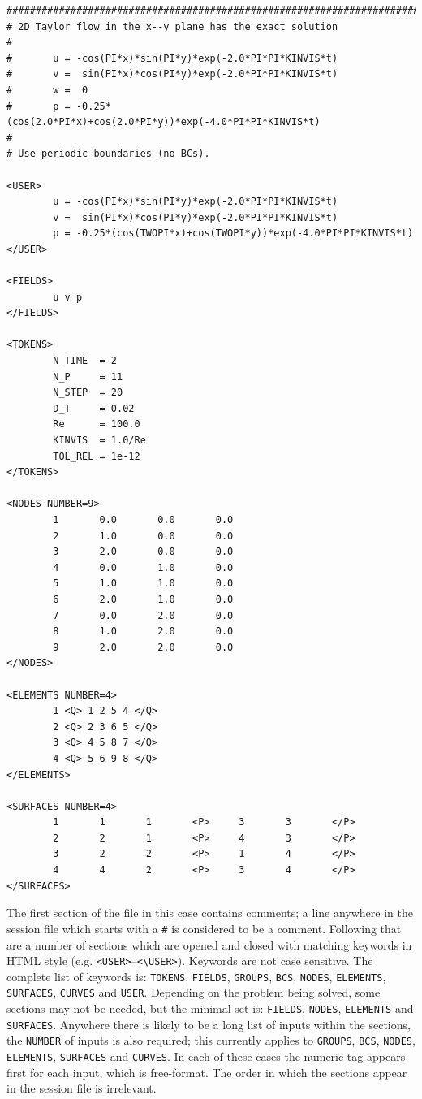 \documentclass[11pt,a4paper]{report}
\begin{document}
{\small
\begin{verbatim}
##############################################################################
# 2D Taylor flow in the x--y plane has the exact solution
#
#       u = -cos(PI*x)*sin(PI*y)*exp(-2.0*PI*PI*KINVIS*t)
#       v =  sin(PI*x)*cos(PI*y)*exp(-2.0*PI*PI*KINVIS*t)
#       w =  0
#       p = -0.25*(cos(2.0*PI*x)+cos(2.0*PI*y))*exp(-4.0*PI*PI*KINVIS*t)
#
# Use periodic boundaries (no BCs).

<USER>
        u = -cos(PI*x)*sin(PI*y)*exp(-2.0*PI*PI*KINVIS*t)
        v =  sin(PI*x)*cos(PI*y)*exp(-2.0*PI*PI*KINVIS*t)
        p = -0.25*(cos(TWOPI*x)+cos(TWOPI*y))*exp(-4.0*PI*PI*KINVIS*t)
</USER>

<FIELDS>
        u v p
</FIELDS>

<TOKENS>
        N_TIME  = 2
        N_P     = 11
        N_STEP  = 20
        D_T     = 0.02
        Re      = 100.0
        KINVIS  = 1.0/Re
        TOL_REL = 1e-12
</TOKENS>

<NODES NUMBER=9>
        1       0.0       0.0       0.0
        2       1.0       0.0       0.0
        3       2.0       0.0       0.0
        4       0.0       1.0       0.0
        5       1.0       1.0       0.0
        6       2.0       1.0       0.0
        7       0.0       2.0       0.0
        8       1.0       2.0       0.0
        9       2.0       2.0       0.0
</NODES>

<ELEMENTS NUMBER=4>
        1 <Q> 1 2 5 4 </Q>
        2 <Q> 2 3 6 5 </Q>
        3 <Q> 4 5 8 7 </Q>
        4 <Q> 5 6 9 8 </Q>
</ELEMENTS>

<SURFACES NUMBER=4>
        1       1       1       <P>     3       3       </P>
        2       2       1       <P>     4       3       </P>
        3       2       2       <P>     1       4       </P>
        4       4       2       <P>     3       4       </P>
</SURFACES>
\end{verbatim}
}

The first section of the file in this case contains comments; a line
anywhere in the session file which starts with a \verb+#+ is
considered to be a comment.  Following that are a number of sections
which are opened and closed with matching keywords in HTML style (e.g.
\verb+<USER>+--\verb+<\USER>+).  Keywords are not case sensitive.
The complete list of keywords is: \texttt{TOKENS}, \texttt{FIELDS}, 
\texttt{GROUPS}, \texttt{BCS}, \texttt{NODES}, \texttt{ELEMENTS}, 
\texttt{SURFACES}, \texttt{CURVES} and \texttt{USER}.  Depending on the
problem being solved, some sections may not be needed, but the minimal
set is: \texttt{FIELDS}, \texttt{NODES}, \texttt{ELEMENTS} and
\texttt{SURFACES}.  Anywhere there is likely to be a long list of
inputs within the sections, the \texttt{NUMBER} of inputs is also
required; this currently applies to \texttt{GROUPS}, \texttt{BCS},
\texttt{NODES}, \texttt{ELEMENTS}, \texttt{SURFACES} and
\texttt{CURVES}.  In each of these cases the numeric tag appears first for
each input, which is free-format.  The order in which the sections
appear in the session file is irrelevant.
\end{document}
